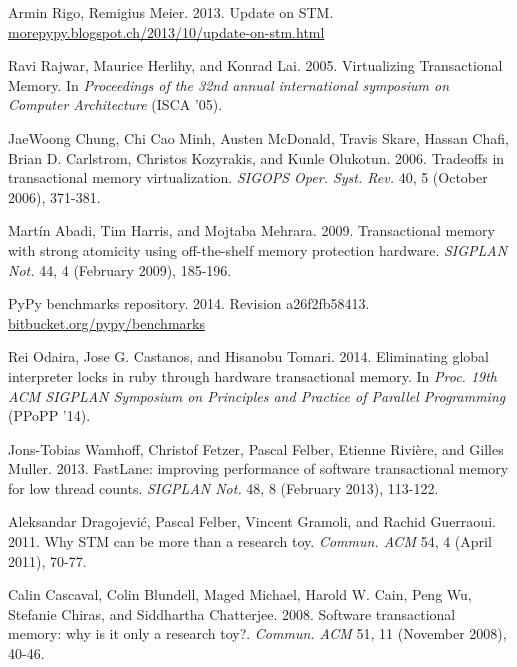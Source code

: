 \documentclass{sigplanconf}
\begin{document}
\begin{thebibliography}{}
 Armin Rigo, Remigius Meier. 2013. Update on
  STM. \url{morepypy.blogspot.ch/2013/10/update-on-stm.html}

 Ravi Rajwar, Maurice Herlihy, and Konrad
  Lai. 2005. Virtualizing Transactional Memory. In \emph{Proceedings of
    the 32nd annual international symposium on Computer Architecture}
  (ISCA '05).

 JaeWoong Chung, Chi Cao Minh, Austen McDonald,
  Travis Skare, Hassan Chafi, Brian D. Carlstrom, Christos Kozyrakis,
  and Kunle Olukotun. 2006. Tradeoffs in transactional memory
  virtualization. \emph{SIGOPS Oper. Syst. Rev.} 40, 5 (October 2006),
  371-381.

 Martín Abadi, Tim Harris, and Mojtaba
  Mehrara. 2009. Transactional memory with strong atomicity using
  off-the-shelf memory protection hardware. \emph{SIGPLAN Not.} 44, 4
  (February 2009), 185-196.

 PyPy benchmarks repository. 2014. Revision
  a26f2fb58413. \url{bitbucket.org/pypy/benchmarks}





  Rei Odaira, Jose G. Castanos, and Hisanobu Tomari. 2014. Eliminating
  global interpreter locks in ruby through hardware transactional
  memory. In \emph{Proc. 19th ACM SIGPLAN Symposium on
    Principles and Practice of Parallel Programming} (PPoPP '14).

  Jons-Tobias Wamhoff, Christof Fetzer, Pascal Felber, Etienne Rivière,
  and Gilles Muller. 2013. FastLane: improving performance of software
  transactional memory for low thread counts. \emph{SIGPLAN Not.} 48, 8
  (February 2013), 113-122.

 Aleksandar Dragojević, Pascal Felber, Vincent
  Gramoli, and Rachid Guerraoui. 2011. Why STM can be more than a
  research toy. \emph{Commun. ACM} 54, 4 (April 2011), 70-77.

  Calin Cascaval, Colin Blundell, Maged Michael, Harold W. Cain, Peng
  Wu, Stefanie Chiras, and Siddhartha Chatterjee. 2008. Software
  transactional memory: why is it only a research
  toy?. \emph{Commun. ACM} 51, 11 (November 2008), 40-46.


\end{thebibliography}
\end{document}
